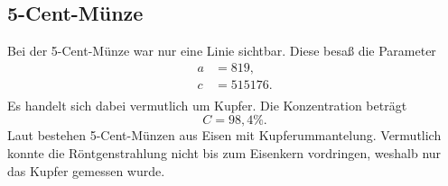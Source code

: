 
\subsection{5-Cent-Münze}

Bei der 5-Cent-Münze war nur eine Linie sichtbar. Diese besaß die Parameter
\begin{align}
 a &= 819, \\
 c &= 515176. \\
\end{align}
Es handelt sich dabei vermutlich um Kupfer. Die Konzentration beträgt
\begin{equation}
 C = 98,4\%.
\end{equation}
Laut \cite{wiki_5ct} bestehen 5-Cent-Münzen aus Eisen mit Kupferummantelung. Vermutlich konnte die Röntgenstrahlung nicht bis zum Eisenkern vordringen, weshalb nur das Kupfer gemessen wurde.
